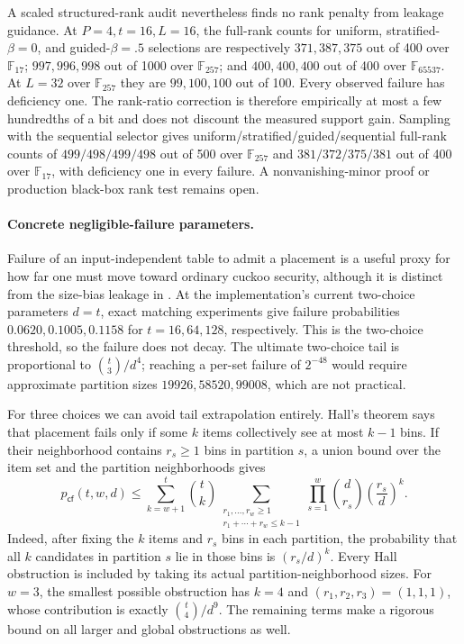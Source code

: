 A scaled structured-rank audit nevertheless finds no rank penalty
from leakage guidance.  At $P=4,t=16,L=16$, the full-rank counts for uniform,
stratified-$\beta=0$, and guided-$\beta=.5$ selections are respectively
$371,387,375$ out of 400 over $\mathbb F_{17}$; $997,996,998$ out of 1000 over
$\mathbb F_{257}$; and $400,400,400$ out of 400 over
$\mathbb F_{65537}$.  At $L=32$ over $\mathbb F_{257}$ they are
$99,100,100$ out of 100.  Every observed failure has deficiency one.  The
rank-ratio correction is therefore empirically at most a few hundredths of a
bit and does not discount the measured support gain.  Sampling with the
sequential selector gives uniform/stratified/guided/sequential full-rank
counts of $499/498/499/498$ out of 500 over $\mathbb F_{257}$ and
$381/372/375/381$ out of 400 over $\mathbb F_{17}$, with deficiency one in
every failure.  A
nonvanishing-minor proof or production black-box rank test remains open.

\paragraph{Concrete negligible-failure parameters.}
Failure of an input-independent table to admit a placement is a useful proxy
for how far one must move toward ordinary cuckoo security, although it is
distinct from the size-bias leakage in
.  At the implementation's current
two-choice parameters $d=t$, exact matching experiments give failure
probabilities $0.0620,0.1005,0.1158$ for $t=16,64,128$, respectively.  This is
the two-choice threshold, so the failure does not decay.  The ultimate
two-choice tail is proportional to $\binom{t}{3}/d^4$; reaching a per-set
failure of $2^{-48}$ would require approximate partition sizes
$19926,58520,99008$, which are not practical.

For three choices we can avoid tail extrapolation entirely.  Hall's theorem
says that placement fails only if some $k$ items collectively see at most
$k-1$ bins.  If their neighborhood contains $r_s\geq1$ bins in partition $s$,
a union bound over the item set and the partition neighborhoods gives
\begin{equation}\label{eq:partitioned-hall-bound}
 p_{\mathsf{cf}}(t,w,d)
 \leq
 \sum_{k=w+1}^{t}\binom tk
 \sum_{\substack{r_1,\ldots,r_w\geq1\\
                  r_1+\cdots+r_w\leq k-1}}
 \prod_{s=1}^{w}
   \binom d{r_s}\left(\frac{r_s}{d}\right)^k .
\end{equation}
Indeed, after fixing the $k$ items and $r_s$ bins in each partition, the
probability that all $k$ candidates in partition $s$ lie in those bins is
$(r_s/d)^k$.  Every Hall obstruction is included by taking its actual
partition-neighborhood sizes.  For $w=3$, the smallest possible obstruction
has $k=4$ and $(r_1,r_2,r_3)=(1,1,1)$, whose contribution is exactly
$\binom t4/d^9$.  The remaining terms make
 a rigorous bound on all larger and
global obstructions as well.

